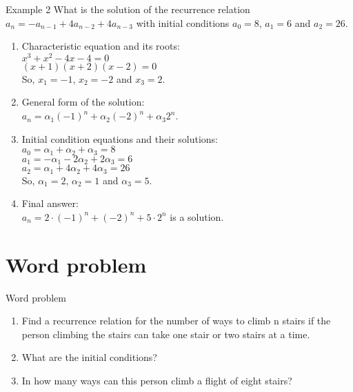 \documentclass{beamer}
\begin{document}
\begin{frame}{Example 2}
    What is the solution of the recurrence relation $a_n = -a_{n-1} + 4 a_{n-2} + 4 a_{n-3}$ with initial conditions $a_0 = 8$, $a_1 = 6$ and $a_2 = 26$.
    \footnotesize
    \begin{enumerate}[<+->]
        \item Characteristic equation and its roots: \\
        $ x^3 + x^2 - 4x - 4 = 0 $ \\
        $ (x + 1)(x + 2)(x - 2) = 0 $ \\
        So, $x_1 = -1$, $x_2 = -2$ and $x_3 = 2$.
        \item General form of the solution: \\
        $ a_n = \alpha_1 (-1)^n + \alpha_2 (-2)^n + \alpha_3 2^n $.
        \item Initial condition equations and their solutions: \\
        $ a_0 = \alpha_1 + \alpha_2 + \alpha_3 = 8 $ \\
        $ a_1 = - \alpha_1 - 2 \alpha_2 + 2 \alpha_3 = 6 $ \\
        $ a_2 = \alpha_1 + 4 \alpha_2 + 4 \alpha_3 = 26 $ \\
        So, $\alpha_1 = 2$, $\alpha_2 = 1$ and $\alpha_3 = 5$.
        \item Final answer: \\
        $ a_n = 2 \cdot (-1)^n + (-2)^n + 5 \cdot 2^n $ is a solution.
    \end{enumerate}
\end{frame}

\section{Word problem}

\begin{frame}{Word problem}
    \begin{enumerate}[<+->]
        \item Find a recurrence relation for the number of ways to climb n stairs if the person climbing the stairs can take one stair or two stairs at a time.
        \item What are the initial conditions?
        \item In how many ways can this person climb a flight of eight stairs?
    \end{enumerate}
\end{frame}
\end{document}
